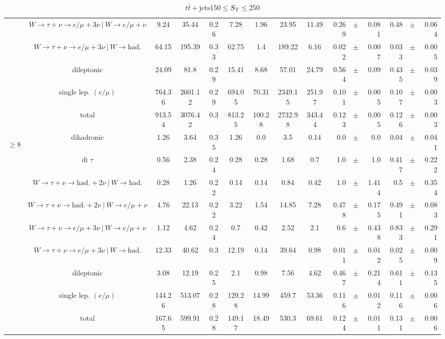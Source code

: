 \documentclass[12pt]{paper}
\newcommand{\ST}{\ensuremath{S_{\rm T}}\xspace}
\newcommand{\ttJets}{\ensuremath{t\bar{t}+\textrm{jets}}\xspace}
\begin{document}
\begin{table}[ht]
\begin{center}
{\begin{tabular}{|c|c|c|c|c|c|c|c|c|rrr|rrr|}
\cline{2-15}
 &$W\rightarrow \tau + \nu \rightarrow e/\mu+3\nu ~|~ W \rightarrow e/\mu + \nu$ & 9.24 & 35.44 & 0.26 & 7.28 & 1.96 & 23.95 & 11.49 & 0.269 & $\pm$ & 0.081 & 0.48 & $\pm$ & 0.064\\
\cline{2-15}
 &$W\rightarrow \tau + \nu \rightarrow e/\mu+3\nu ~|~ W \rightarrow \textrm{had.}$ & 64.15 & 195.39 & 0.33 & 62.75 & 1.4 & 189.22 & 6.16 & 0.022 & $\pm$ & 0.007 & 0.033 & $\pm$ & 0.005\\
\cline{2-15}
 &dileptonic & 24.09 & 81.8 & 0.29 & 15.41 & 8.68 & 57.01 & 24.79 & 0.564 & $\pm$ & 0.09 & 0.435 & $\pm$ & 0.039\\
\cline{2-15}
 &single lep. $(e/\mu)$ & 764.36 & 2601.12 & 0.29 & 694.05 & 70.31 & 2349.15 & 251.97 & 0.101 & $\pm$ & 0.005 & 0.107 & $\pm$ & 0.003\\
\cline{2-15}
 &total & 913.54 & 3076.42 & 0.3 & 813.25 & 100.28 & 2732.98 & 343.44 & 0.123 & $\pm$ & 0.005 & 0.126 & $\pm$ & 0.003\\
\hline
\hline\multirow{9}{*}{\begin{sideways}$\geq8$\end{sideways}}
 &dihadronic & 1.26 & 3.64 & 0.35 & 1.26 & 0.0 & 3.5 & 0.14 & 0.0 & $\pm$ & 0.0 & 0.04 & $\pm$ & 0.041\\
\cline{2-15}
 &di $\tau$ & 0.56 & 2.38 & 0.24 & 0.28 & 0.28 & 1.68 & 0.7 & 1.0 & $\pm$ & 1.0 & 0.417 & $\pm$ & 0.222\\
\cline{2-15}
 &$W\rightarrow \tau + \nu \rightarrow \textrm{had.}+2\nu ~|~ W \rightarrow \textrm{had.}$ & 0.28 & 1.26 & 0.22 & 0.14 & 0.14 & 0.84 & 0.42 & 1.0 & $\pm$ & 1.414 & 0.5 & $\pm$ & 0.354\\
\cline{2-15}
 &$W\rightarrow \tau + \nu \rightarrow \textrm{had.}+2\nu ~|~ W \rightarrow e/\mu + \nu$ & 4.76 & 22.13 & 0.22 & 3.22 & 1.54 & 14.85 & 7.28 & 0.478 & $\pm$ & 0.175 & 0.491 & $\pm$ & 0.083\\
\cline{2-15}
 &$W\rightarrow \tau + \nu \rightarrow e/\mu+3\nu ~|~ W \rightarrow e/\mu + \nu$ & 1.12 & 4.62 & 0.24 & 0.7 & 0.42 & 2.52 & 2.1 & 0.6 & $\pm$ & 0.438 & 0.833 & $\pm$ & 0.291\\
\cline{2-15}
 &$W\rightarrow \tau + \nu \rightarrow e/\mu+3\nu ~|~ W \rightarrow \textrm{had.}$ & 12.33 & 40.62 & 0.3 & 12.19 & 0.14 & 39.64 & 0.98 & 0.011 & $\pm$ & 0.012 & 0.025 & $\pm$ & 0.009\\
\cline{2-15}
 &dileptonic & 3.08 & 12.19 & 0.25 & 2.1 & 0.98 & 7.56 & 4.62 & 0.467 & $\pm$ & 0.214 & 0.611 & $\pm$ & 0.135\\
\cline{2-15}
 &single lep. $(e/\mu)$ & 144.26 & 513.07 & 0.28 & 129.28 & 14.99 & 459.7 & 53.36 & 0.116 & $\pm$ & 0.012 & 0.116 & $\pm$ & 0.006\\
\cline{2-15}
 &total & 167.65 & 599.91 & 0.28 & 149.17 & 18.49 & 530.3 & 69.61 & 0.124 & $\pm$ & 0.011 & 0.131 & $\pm$ & 0.006\\
\hline
\end{tabular}}\end{center}\caption{\ttJets $150\leq$\ST$\leq250$}\end{table}
\end{document}
